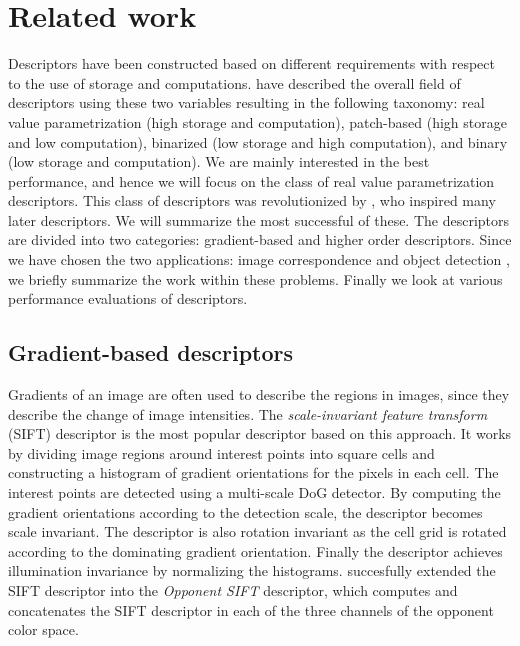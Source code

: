 \documentclass[thesis.tex]{subfiles}
\begin{document}
\chapter{Related work}
Descriptors have been constructed based on different requirements with respect to the use of storage and computations. \citet{heinly2012comparative} have described the overall field of descriptors using these two variables resulting in the following taxonomy: real value parametrization (high storage and computation), patch-based (high storage and low computation), binarized (low storage and high computation), and binary (low storage and computation). We are mainly interested in the best performance, and hence we will focus on the class of real value parametrization descriptors. This class of descriptors was revolutionized by \citet{lowe2004distinctive}, who inspired many later descriptors. We will summarize the most successful of these. The descriptors are divided into two categories: gradient-based and higher order descriptors. Since we have chosen the two applications: image correspondence and object detection , we briefly summarize the work within these problems. Finally we look at various performance evaluations of descriptors.

\section{Gradient-based descriptors}
\label{sec:gradientDescriptors}
Gradients of an image are often used to describe the regions in images, since they describe the change of image intensities. The \emph{scale-invariant feature transform} (SIFT) descriptor \cite{lowe2004distinctive} is the most popular descriptor based on this approach. It works by dividing image regions around interest points into square cells and constructing a histogram of gradient orientations for the pixels in each cell. The interest points are detected using a multi-scale DoG detector. By computing the gradient orientations according to the detection scale, the descriptor becomes scale invariant. The descriptor is also rotation invariant as the cell grid is rotated according to the dominating gradient orientation. Finally the descriptor achieves illumination invariance by normalizing the histograms. \citet{van2010evaluating} succesfully extended the SIFT descriptor into the \emph{Opponent SIFT} descriptor, which computes and concatenates the SIFT descriptor in each of the three channels of the opponent color space.
\end{document}
